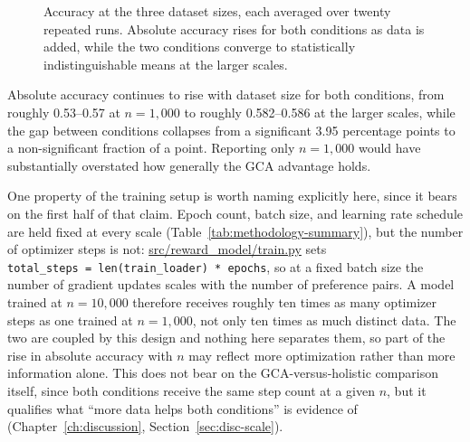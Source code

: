 \begin{figure}[htbp]
\centering
{}
\caption[Accuracy at the three dataset sizes]{Accuracy at the three dataset sizes, each averaged over twenty
repeated runs. Absolute accuracy rises for both conditions as data is
added, while the two conditions converge to statistically indistinguishable
means at the larger scales.}
\label{fig:scale-results}
\end{figure}

Absolute accuracy continues to rise with dataset size for both conditions,
from roughly 0.53--0.57 at $n=1{,}000$ to roughly 0.582--0.586 at the larger
scales, while the gap between conditions collapses from a significant 3.95
percentage points to a non-significant fraction of a point. Reporting only
$n=1{,}000$ would have substantially overstated how generally the GCA
advantage holds.

One property of the training setup is worth naming explicitly here, since
it bears on the first half of that claim. Epoch count, batch size, and
learning rate schedule are held fixed at every scale
(Table~\ref{tab:methodology-summary}), but the number of optimizer steps
is not: \url{src/reward_model/train.py} sets
\texttt{total\_steps~=~len(train\_loader)~*~epochs}, so at a fixed batch
size the number of gradient updates scales with the number of preference
pairs. A model trained at $n=10{,}000$ therefore receives roughly ten times
as many optimizer steps as one trained at $n=1{,}000$, not only ten times
as much distinct data. The two are coupled by this design and nothing here
separates them, so part of the rise in absolute accuracy with $n$ may
reflect more optimization rather than more information alone. This does
not bear on the GCA-versus-holistic comparison itself, since both
conditions receive the same step count at a given $n$, but it qualifies
what ``more data helps both conditions'' is evidence of
(Chapter~\ref{ch:discussion}, Section~\ref{sec:disc-scale}).

